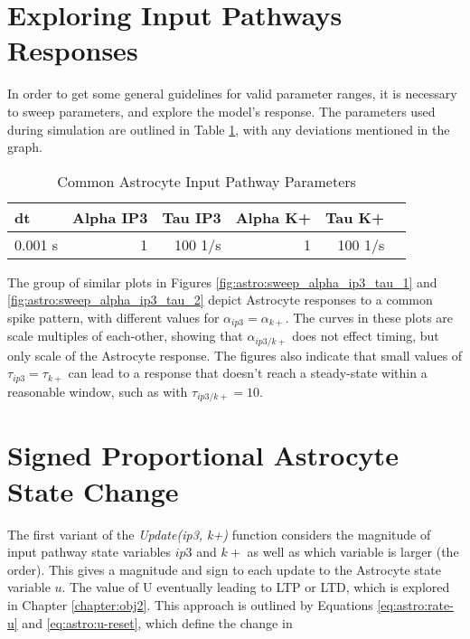 \section{Exploring Input Pathways Responses}

In order to get some general guidelines for valid parameter ranges, it is
necessary to sweep parameters, and explore the model's response. The parameters
used during simulation are outlined in Table \ref{table:astro_in_path_params},
with any deviations mentioned in the graph.

\begin{table}[!htp] \centering
  \caption{Common Astrocyte Input Pathway Parameters} \label{table:astro_in_path_params}
  \scriptsize
  \begin{tabular}{lrrrrr}\toprule
    dt &Alpha IP3 &Tau IP3 &Alpha K+ &Tau K+ \\\midrule
    0.001 s &1 &100 1/s &1 &100 1/s \\
    \bottomrule
  \end{tabular}
\end{table}



The group of similar plots in Figures \ref{fig:astro:sweep_alpha_ip3_tau_1} and
\ref{fig:astro:sweep_alpha_ip3_tau_2} depict Astrocyte responses to a common
spike pattern, with different values for $\alpha_{ip3}=\alpha_{k+}$. The
curves in these plots are scale multiples of each-other, showing that
$\alpha_{ip3/k+}$ does not effect timing, but only scale of the Astrocyte
response. The figures also indicate that small values of
$\tau_{ip3}=\tau_{k+}$ can lead to a response that doesn't reach a
steady-state within a reasonable window, such as with $\tau_{ip3/k+} = 10$.


\section{Signed Proportional Astrocyte State Change}

The first variant of the \emph{Update(ip3, k+)} function considers the
magnitude of input pathway state variables $ip3$ and $k+$ as well as which
variable is larger (the order). This gives a magnitude and sign to each
update to the Astrocyte state variable $u$. The value of U eventually leading to LTP or
LTD, which is explored in Chapter \ref{chapter:obj2}. This approach is outlined
by Equations \ref{eq:astro:rate-u} and \ref{eq:astro:u-reset}, which define the
change in \ca


